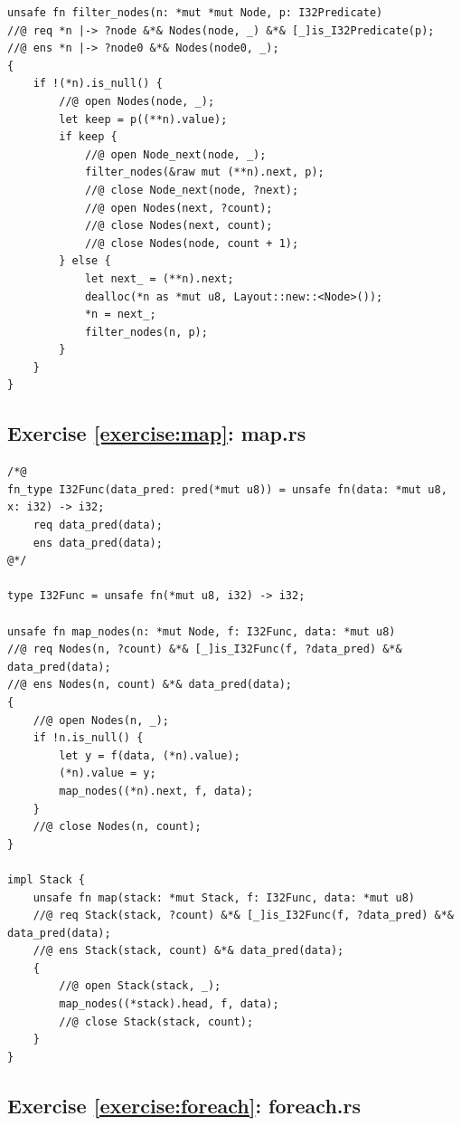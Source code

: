 \documentclass{article}
\begin{document}
\begin{lstlisting}
unsafe fn filter_nodes(n: *mut *mut Node, p: I32Predicate)
//@ req *n |-> ?node &*& Nodes(node, _) &*& [_]is_I32Predicate(p);
//@ ens *n |-> ?node0 &*& Nodes(node0, _);
{
    if !(*n).is_null() {
        //@ open Nodes(node, _);
        let keep = p((**n).value);
        if keep {
            //@ open Node_next(node, _);
            filter_nodes(&raw mut (**n).next, p);
            //@ close Node_next(node, ?next);
            //@ open Nodes(next, ?count);
            //@ close Nodes(next, count);
            //@ close Nodes(node, count + 1);
        } else {
            let next_ = (**n).next;
            dealloc(*n as *mut u8, Layout::new::<Node>());
            *n = next_;
            filter_nodes(n, p);
        }
    }
}
\end{lstlisting}

\subsection{Exercise \ref{exercise:map}:
map.rs}\label{solution:map}

\begin{lstlisting}
/*@
fn_type I32Func(data_pred: pred(*mut u8)) = unsafe fn(data: *mut u8, x: i32) -> i32;
    req data_pred(data);
    ens data_pred(data);
@*/

type I32Func = unsafe fn(*mut u8, i32) -> i32;

unsafe fn map_nodes(n: *mut Node, f: I32Func, data: *mut u8)
//@ req Nodes(n, ?count) &*& [_]is_I32Func(f, ?data_pred) &*& data_pred(data);
//@ ens Nodes(n, count) &*& data_pred(data);
{
    //@ open Nodes(n, _);
    if !n.is_null() {
        let y = f(data, (*n).value);
        (*n).value = y;
        map_nodes((*n).next, f, data);
    }
    //@ close Nodes(n, count);
}

impl Stack {
    unsafe fn map(stack: *mut Stack, f: I32Func, data: *mut u8)
    //@ req Stack(stack, ?count) &*& [_]is_I32Func(f, ?data_pred) &*& data_pred(data);
    //@ ens Stack(stack, count) &*& data_pred(data);
    {
        //@ open Stack(stack, _);
        map_nodes((*stack).head, f, data);
        //@ close Stack(stack, count);
    }
}
\end{lstlisting}

\subsection{Exercise \ref{exercise:foreach}:
foreach.rs}\label{solution:foreach}
\end{document}
